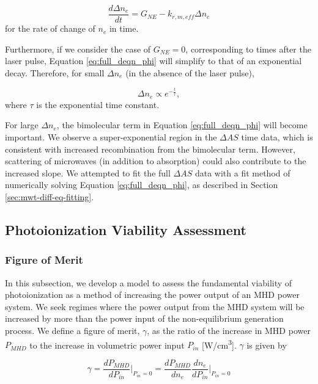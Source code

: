 \begin{equation}
  \label{eq:small_pert_diffeq}
\frac{d\Delta n_{e}}{dt} = G_{NE} - k_{r,m,eff} \Delta n_{e}
\end{equation}
for the rate of change of $n_e$ in time.

Furthermore, if we consider the case of $G_{NE} = 0$, corresponding to times after the laser pulse, Equation \ref{eq:full_deqn_phi} will simplify to that of an exponential decay. Therefore, for small $\Delta n_e$ (in the absence of the laser pulse),  

\begin{equation}
  \label{eq:ne_exp_decay}
  \Delta n_e \propto e^{-\frac{t}{\tau}},
\end{equation}
where $\tau$ is the exponential time constant. 

For large $\Delta n_e$, the bimolecular term in Equation \ref{eq:full_deqn_phi} will become important. We observe a super-exponential region in the $\Delta AS$ time data, which is consistent with increased recombination from the bimolecular term. However, scattering of microwaves (in addition to absorption) could also contribute to the increased slope. We attempted to fit the full $\Delta AS$ data with a fit method of numerically solving Equation \ref{eq:full_deqn_phi}, as described in Section \ref{sec:mwt-diff-eq-fitting}. 

\subsection{Photoionization Viability Assessment}

\subsubsection{Figure of Merit}

In this subsection, we develop a model to assess the fundamental viability of photoionization as a method of increasing the power output of an MHD power system. We seek regimes where the power output from the MHD system will be increased by more than the power input of the non-equilibrium generation process. We define a figure of merit, $\gamma$, as the ratio of the increase in MHD power $P_{MHD}$ to the increase in volumetric power input $P_{in}$ [\unit{\watt/\centi\meter^3}]. $\gamma$ is given by

\begin{equation}
  \label{eq:beta_def}
\gamma = \frac{dP_{MHD}}{dP_{in}} \Big|_{P_{in}=0} = \frac{dP_{MHD}}{dn_{e}}\frac{dn_{e}}{dP_{in}}\Big|_{P_{in}=0}
\end{equation}

